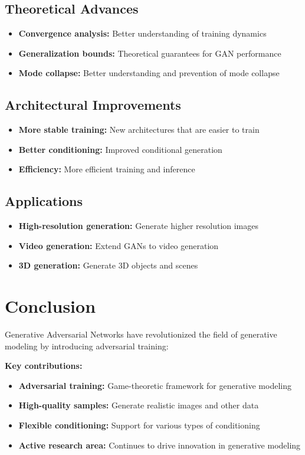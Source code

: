 \subsection{Theoretical Advances}

\begin{itemize}
    \item \textbf{Convergence analysis:} Better understanding of training dynamics
    \item \textbf{Generalization bounds:} Theoretical guarantees for GAN performance
    \item \textbf{Mode collapse:} Better understanding and prevention of mode collapse
\end{itemize}

\subsection{Architectural Improvements}

\begin{itemize}
    \item \textbf{More stable training:} New architectures that are easier to train
    \item \textbf{Better conditioning:} Improved conditional generation
    \item \textbf{Efficiency:} More efficient training and inference
\end{itemize}

\subsection{Applications}

\begin{itemize}
    \item \textbf{High-resolution generation:} Generate higher resolution images
    \item \textbf{Video generation:} Extend GANs to video generation
    \item \textbf{3D generation:} Generate 3D objects and scenes
\end{itemize}

\section{Conclusion}

Generative Adversarial Networks have revolutionized the field of generative modeling by introducing adversarial training:

\textbf{Key contributions:}
\begin{itemize}
    \item \textbf{Adversarial training:} Game-theoretic framework for generative modeling
    \item \textbf{High-quality samples:} Generate realistic images and other data
    \item \textbf{Flexible conditioning:} Support for various types of conditioning
    \item \textbf{Active research area:} Continues to drive innovation in generative modeling
\end{itemize}

